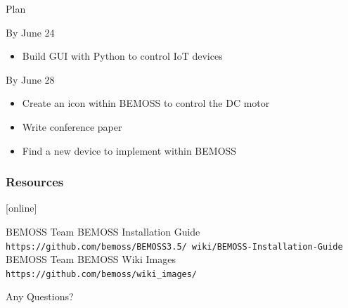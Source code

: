 \documentclass{beamer}
\begin{document}
\begin{frame}{Plan}
	\begin{block}{By June 24}
		\begin{itemize}			
			\item Build GUI with Python to control IoT devices
		\end{itemize}
	\end{block}
	\begin{block}{By June 28}
	\begin{itemize}
		\item Create an icon within BEMOSS to control the DC motor
		\item Write conference paper
		\item Find a new device to implement within BEMOSS
	\end{itemize}
	\end{block}
\end{frame}


\begin{frame}[allowframebreaks]
  \frametitle<presentation>{Resources}
    
  \begin{thebibliography}{10}
    
  [online]
  
    BEMOSS Team
    \newblock BEMOSS Installation Guide
    \newblock \texttt{https://github.com/bemoss/BEMOSS3.5/
    wiki/BEMOSS-Installation-Guide
   } 
  	BEMOSS Team
  	\newblock BEMOSS Wiki Images
  	\newblock \texttt{https://github.com/bemoss/wiki\_images/}
 
  \end{thebibliography}
\end{frame}

\begin{frame}
\Huge\center
Any Questions?
\end{frame}
\end{document}
